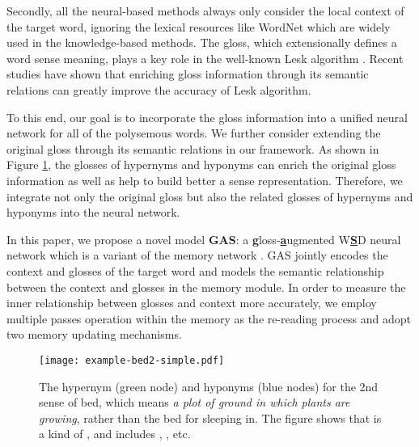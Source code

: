 \documentclass[11pt,a4paper]{article}
\begin{document}
Secondly, all the neural-based methods always only consider the local context of the target word, ignoring the lexical resources like WordNet \cite{wordnet} which are widely used in the knowledge-based methods.
The gloss, which extensionally defines a word sense meaning, plays a key role in the well-known Lesk algorithm \cite{Lesk1986Lesk}.
Recent studies \cite{banerjee2002adapted,Basile2014LeskExt} have shown that enriching gloss information through its semantic relations can greatly improve the accuracy of Lesk algorithm.




To this end, our goal is to incorporate the gloss information into a unified neural network for all of the polysemous words.
We further consider extending the original gloss through its semantic relations in our framework.
As shown in Figure \ref{fig:example}, the glosses of hypernyms and hyponyms can enrich the original gloss information as well as help to build better a sense representation.
Therefore, we integrate not only the original gloss but also the related glosses of hypernyms and hyponyms into the neural network.

In this paper, we propose a novel model \textbf{GAS}: a \uline{\bf g}loss-\uline{\bf a}ugmented W\uline{\bf S}D neural network which is a variant of the memory network \cite{sukhbaatar2015MN,kumar2016dmn,xiong2016dnn1}.
GAS jointly encodes the context and glosses of the target word and models the semantic relationship between the context and glosses in the memory module.
In order to measure the inner relationship between glosses and context more accurately, we employ multiple passes operation within the memory as the re-reading process and adopt two memory updating mechanisms.
\begin{figure}[]
\centering
\texttt{[image: example-bed2-simple.pdf]}
\vspace{-0.4in}
\caption{The hypernym (green node) and hyponyms (blue nodes) for the 2nd sense {\em } of bed, which means {\em a plot of ground in which plants are growing}, rather than the bed for sleeping in.
The figure shows that {\em } is a kind of {\em }, and {\em } includes {\em }, {\em }, etc.
}\label{fig:example}
\vspace{-0.15in}
\end{figure}
\end{document}
